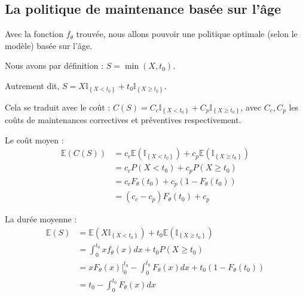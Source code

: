 \documentclass[10pt,a4paper]{article}
\begin{document}
\FloatBarrier

\subsection{La politique de maintenance basée sur l'âge}

Avec la fonction $f_\theta$ trouvée, nous allons pouvoir une politique optimale (selon le modèle) basée sur l'âge.

Nous avons par définition : $S = \min \left( {X,{t_0}} \right)$.

Autrement dit, $S = X{\mathbb{I}_{\left\{ {X < {t_0}} \right\}}} + {t_0}{\mathbb{I}_{\left\{ {X \geqslant {t_0}} \right\}}}$.

Cela se traduit avec le coût : $C\left( S \right) = {C_c}{\mathbb{I}_{\left\{ {X < {t_0}} \right\}}} + {C_p}{\mathbb{I}_{\left\{ {X \geqslant {t_0}} \right\}}}$, avec $C_c, C_p$ les coûts de maintenances correctives et préventives respectivement.

Le coût moyen :
\begin{align}
    \label{coutmoy}
    \mathbb{E}\left( {C\left( S \right)} \right) & = {c_c}\mathbb{E}\left( {{\mathbb{I}_{\left\{ {X < {t_0}} \right\}}}} \right) + {c_p}\mathbb{E}\left( {{\mathbb{I}_{\left\{ {X \geqslant {t_0}} \right\}}}} \right) \nonumber \\
    & = {c_c}P\left( {X < {t_0}} \right) + {c_p}P\left( {X \geqslant {t_0}} \right) \nonumber \\
    & = {c_c}{F_\theta }\left( {{t_0}} \right) + {c_p}\left( {1 - {F_\theta }\left( {{t_0}} \right)} \right) \nonumber \\
    & = \left( {{c_c} - {c_p}} \right){F_\theta }\left( {{t_0}} \right) + {c_p}
\end{align}

La durée moyenne :
\begin{align}
    \label{dureemoy}
    \mathbb{E}\left( S \right) & = \mathbb{E}\left( {X{\mathbb{I}_{\left\{ {X < {t_0}} \right\}}}} \right) + {t_0}\mathbb{E}\left( {{\mathbb{I}_{\left\{ {X \geqslant {t_0}} \right\}}}} \right)\nonumber\\
    & = \int_0^{{t_0}} {x{f_\theta }\left( x \right)dx}  + {t_0}P\left( {X \geqslant {t_0}} \right) \nonumber \\
    & = x{F_\theta }\left( x \right)|_0^{{t_0}} - \int_0^{{t_0}} {{F_\theta }\left( x \right)dx}  + {t_0}\left( {1 - {F_\theta }\left( {{t_0}} \right)} \right) \nonumber \\
    & = {t_0} - \int_0^{{t_0}} {{F_\theta }\left( x \right)dx}
\end{align}
\end{document}
